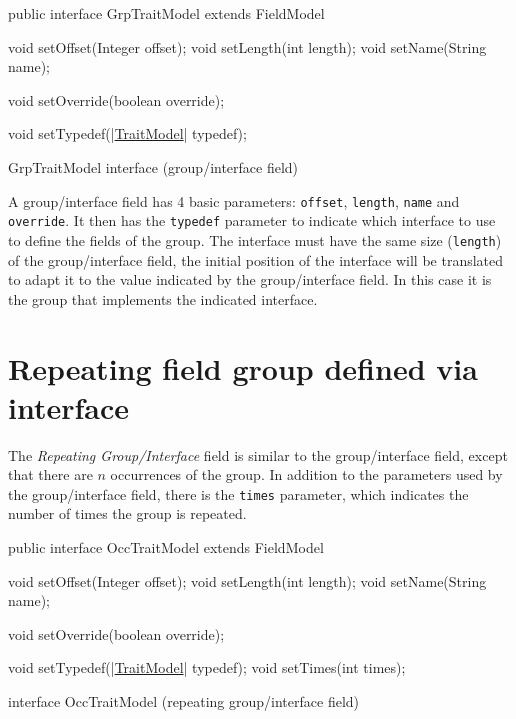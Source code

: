\documentclass[a4paper,10pt]{report}
\newenvironment{elisting}[1][H]
  {\captionsetup{aboveskip=0pt}\begin{listing}[#1]}
  {\end{listing}%
}
\begin{document}
\begin{elisting}[!htb]
\begin{javacode}
public interface GrpTraitModel extends FieldModel {
    void setOffset(Integer offset);
    void setLength(int length);
    void setName(String name);
    
    void setOverride(boolean override);
    
    void setTypedef(|\hyperref[lst:TraitModel]{TraitModel}| typedef);
}
\end{javacode}
\caption{GrpTraitModel interface (group/interface field)}
\label{lst:GrpTraitModel}
\end{elisting}

A group/interface field has 4 basic parameters: \verb!offset!, \verb!length!, 
\verb!name! and \verb!override!. It then has the \verb!typedef! parameter to 
indicate which interface to use to define the fields of the group. 
The interface must have the same size (\verb!length!) of the group/interface 
field, the initial position of the interface will be translated to adapt it to 
the value indicated by the group/interface field. 
In this case it is the group that implements the indicated interface.


\section{Repeating field group defined via interface}
The \textsl{Repeating Group/Interface} field is similar to the group/interface 
field, except that there are $n$ occurrences of the group. 
In addition to the parameters used by the group/interface field, there is the 
\verb!times! parameter, which indicates the number of times the group is 
repeated.

\begin{elisting}[!htb]
\begin{javacode}
public interface OccTraitModel extends FieldModel {
    void setOffset(Integer offset);
    void setLength(int length);
    void setName(String name);
    
    void setOverride(boolean override);
    
    void setTypedef(|\hyperref[lst:TraitModel]{TraitModel}| typedef);
    void setTimes(int times);
}
\end{javacode}
\caption{interface OccTraitModel (repeating group/interface field)}
\label{lst:OccTraitModel}
\end{elisting}
\end{document}
